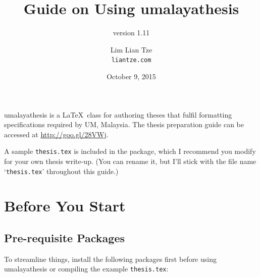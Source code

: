 \documentclass[a4paper,12pt]{scrartcl}
\title{Guide on Using umalayathesis}
\subtitle{version 1.11}
\author{Lim Lian Tze\\\texttt{\smaller liantze\string@gmail.com}}
\date{\smaller October 9, 2015}
\begin{document}
\maketitle

%

%
%

\textsf{umalayathesis} is a \LaTeX\ class for authoring theses that fulfil formatting specifications required by \gls{UM}, Malaysia. The thesis preparation guide can be accessed at \url{http://goo.gl/28VWj}. 

A sample \texttt{thesis.tex} is included in the package, which I recommend you modify for your own thesis write-up. (You can rename it, but I'll stick with the file name `\texttt{thesis.tex}' throughout this guide.)

\section{Before You Start}
\subsection{Pre-requisite Packages}
To streamline things, install the following packages first before using \textsf{umalayathesis} or compiling the example \texttt{thesis.tex}:
\end{document}
